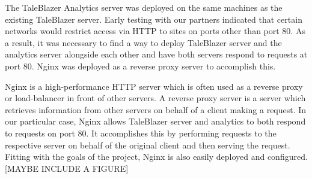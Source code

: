 The TaleBlazer Analytics server was deployed on the same machines as the existing TaleBlazer server. Early testing with our partners indicated that certain networks would restrict access via HTTP to sites on ports other than port 80. As a result, it was necessary to find a way to deploy TaleBlazer server and the analytics server alongside each other and have both servers respond to requests at port 80. Nginx was deployed as a reverse proxy server to accomplish this. 

Nginx is a high-performance HTTP server which is often used as a reverse proxy or load-balancer in front of other servers. A reverse proxy server is a server which retrieves information from other servers on behalf of a client making a request. In our particular case, Nginx allows TaleBlazer server and analytics to both respond to requests on port 80. It accomplishes this by performing requests to the respective server on behalf of the original client and then serving the request. Fitting with the goals of the project, Nginx is also easily deployed and configured. [MAYBE INCLUDE A FIGURE]







	




















